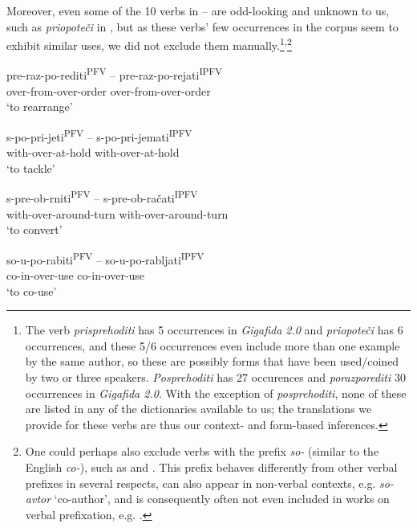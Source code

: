 \documentclass[output=paper,colorlinks,citecolor=brown]{langscibook}
\begin{document}
Moreover, even some of the 10 verbs in -- are odd-looking and unknown to us, such as \textit{priopoteči} in , but as these verbs' few occurrences in the corpus seem to exhibit similar uses, we did not exclude them manually.\footnote{The verb \textit{prisprehoditi} has 5 occurrences in \textit{Gigafida 2.0} and \textit{priopoteči} has 6 occurrences, and these 5/6 occurrences even include more than one example by the same author, so these are possibly forms that have been used/coined by two or three speakers. \textit{Posprehoditi} has 27 occurences and \textit{porazporediti} 30 occurrences in \textit{Gigafida 2.0}. With the exception of \textit{posprehoditi}, none of these are listed in any of the dictionaries available to us; the translations we provide for these verbs are thus our context- and form-based inferences.}\textsuperscript{,}\footnote{One could perhaps also exclude verbs with the prefix \textit{so-}  (similar to the English \textit{co-}), such as  and . This prefix behaves differently from other verbal prefixes in several respects, can also appear in non-verbal contexts, e.g. \textit{so-avtor} `co-author', and is consequently often not even included in works on verbal prefixation, e.g. \citet{Muha1993}.}

\ea \label{ex:ppprediti}
 \gll pre-raz-po-rediti\textsuperscript{PFV} -- %
 pre-raz-po-rejati\textsuperscript{IPFV} \\ 
over-from-over-order {} over-from-over-order\\ 
\glt `to rearrange’\\
\z 

\ea \label{ex:pppjeti}
\gll s-po-pri-jeti\textsuperscript{PFV} -- s-po-pri-jemati\textsuperscript{IPFV} \\ 
with-over-at-hold {} with-over-at-hold\\ 
\glt `to tackle’\\
\z 

\ea \label{ex:ppprniti}
 \gll s-pre-ob-rniti\textsuperscript{PFV} -- s-pre-ob-račati\textsuperscript{IPFV} \\ 
with-over-around-turn {} with-over-around-turn\\ 
\glt `to convert’\\
\z 

\ea \label{ex:ppprabiti}
 \gll so-u-po-rabiti\textsuperscript{PFV}  -- so-u-po-rabljati\textsuperscript{IPFV}  \\ 
co-in-over-use {} co-in-over-use\\ 
\glt `to co-use’\\
\z
\end{document}
